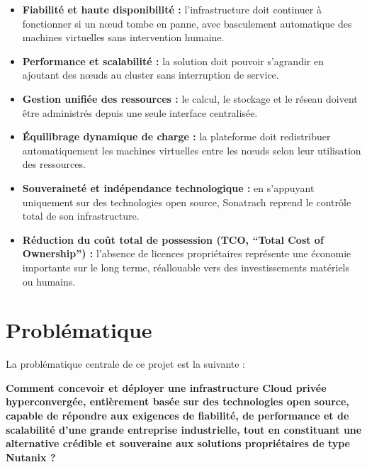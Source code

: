 \begin{itemize}

    \item \textbf{Fiabilité et haute disponibilité :} l'infrastructure doit continuer à fonctionner si un n\oe{}ud tombe en panne, avec basculement automatique des machines virtuelles sans intervention humaine.

    \item \textbf{Performance et scalabilité :} la solution doit pouvoir s'agrandir en ajoutant des n\oe{}uds au cluster sans interruption de service.

    \item \textbf{Gestion unifiée des ressources :} le calcul, le stockage et le réseau doivent être administrés depuis une seule interface centralisée.

    \item \textbf{Équilibrage dynamique de charge :} la plateforme doit redistribuer automatiquement les machines virtuelles entre les n\oe{}uds selon leur utilisation des ressources.

    \item \textbf{Souveraineté et indépendance technologique :} en s'appuyant uniquement sur des technologies open source, Sonatrach reprend le contrôle total de son infrastructure.

    \item \textbf{Réduction du coût total de possession (TCO, ``Total Cost of Ownership'') :} l'absence de licences propriétaires représente une économie importante sur le long terme, réallouable vers des investissements matériels ou humains.

\end{itemize}

\section{Problématique}

\par La problématique centrale de ce projet est la suivante :\\

\par \textbf{Comment concevoir et déployer une infrastructure Cloud privée hyperconvergée, entièrement basée sur des technologies open source, capable de répondre aux exigences de fiabilité, de performance et de scalabilité d'une grande entreprise industrielle, tout en constituant une alternative crédible et souveraine aux solutions propriétaires de type Nutanix ?}\\

